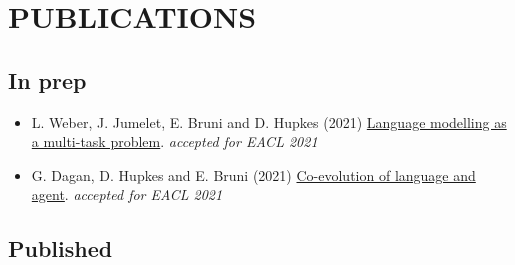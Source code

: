 \section{PUBLICATIONS}

\subsection{In prep}

\begin{itemize}
\setlength\itemsep{5pt}
\item L. Weber, J. Jumelet, E. Bruni and D. Hupkes (2021) \href{https://arxiv.org/pdf/2101.11287.pdf}{Language modelling as a multi-task problem}. \textit{accepted for EACL 2021}
\item G. Dagan, D. Hupkes and E. Bruni (2021) \href{https://arxiv.org/pdf/2001.03361.pdf}{Co-evolution of language and agent}. \textit{accepted for EACL 2021}
\end{itemize}

\subsection{Published}

